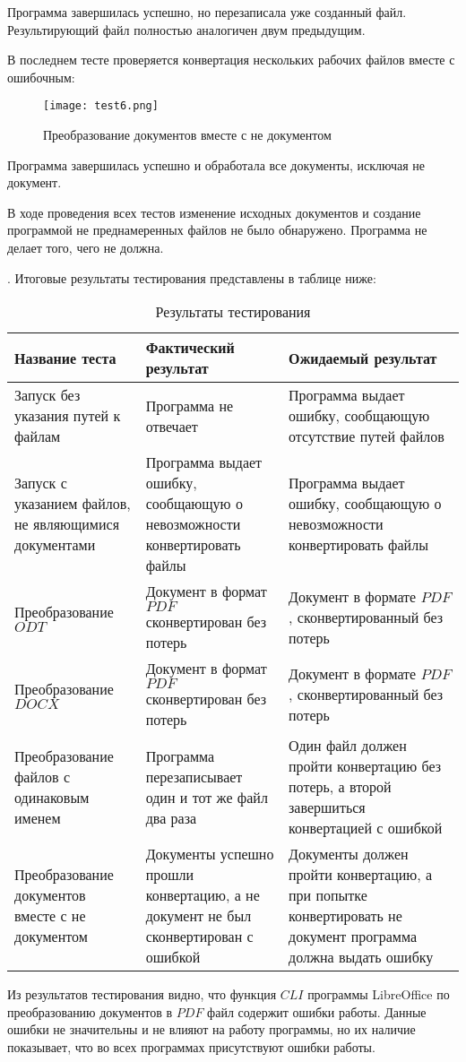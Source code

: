 \documentclass[12pt]{article}
\begin{document}
    Программа завершилась успешно, но перезаписала уже созданный файл. Результирующий файл полностью аналогичен двум предыдущим.

    В последнем тесте проверяется конвертация нескольких рабочих файлов вместе с ошибочным:
    \begin{figure}[h]
        \texttt{[image: test6.png]}
        \centering
        \caption{Преобразование документов вместе с не документом}
    \end{figure}

    Программа завершилась успешно и обработала все документы, исключая не документ.

    В ходе проведения всех тестов изменение исходных документов и создание программой не преднамеренных файлов не было обнаружено. Программа не делает того, чего не должна.

    . Итоговые результаты тестирования представлены в таблице ниже:

    \begin{table}[h]
        \centering
        \begin{tabularx}{\textwidth}{m X X}
            \hline
            Название теста & Фактический результат & Ожидаемый результат \\
            \hline
            Запуск без указания путей к файлам & Программа не отвечает & Программа выдает ошибку, сообщающую отсутствие путей файлов \\
            \hline
            Запуск с указанием файлов, не являющимися документами & Программа выдает ошибку, сообщающую о невозможности конвертировать файлы & Программа выдает ошибку, сообщающую о невозможности конвертировать файлы \\
            \hline
            Преобразование $ODT$ & Документ в формат $PDF$ сконвертирован без потерь & Документ в формате $PDF$, сконвертированный без потерь \\
            \hline
            Преобразование $DOCX$ & Документ в формат $PDF$ сконвертирован без потерь & Документ в формате $PDF$, сконвертированный без потерь \\
            \hline
            Преобразование файлов с одинаковым именем & Программа перезаписывает один и тот же файл два раза & Один файл должен пройти конвертацию без потерь, а второй завершиться конвертацией с ошибкой \\
            \hline
            Преобразование документов вместе с не документом & Документы успешно прошли конвертацию, а не документ не был сконвертирован с ошибкой & Документы должен пройти конвертацию, а при попытке конвертировать не документ программа должна выдать ошибку \\
            \hline
        \end{tabularx}
        \caption{Результаты тестирования}
    \end{table}
    Из результатов тестирования видно, что функция $CLI$ программы LibreOffice по преобразованию документов в $PDF$ файл содержит ошибки работы. Данные ошибки не значительны и не влияют на работу программы, но их наличие показывает, что во всех программах присутствуют ошибки работы.
\end{document}
